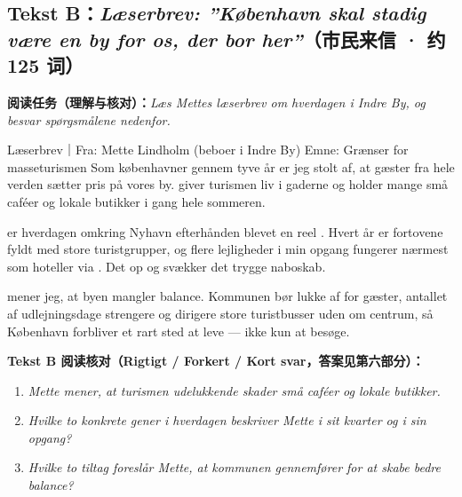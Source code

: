 \subsection*{Tekst B：\textit{Læserbrev: ”København skal stadig være en by for os, der bor her”}（市民来信 · 约 125 词）}

\textbf{阅读任务（理解与核对）：}\textit{Læs Mettes læserbrev om hverdagen i Indre By, og besvar spørgsmålene nedenfor.}

\begin{emailbox}{Læserbrev｜Fra: Mette Lindholm (beboer i Indre By) \quad Emne: Grænser for masseturismen}
Som københavner gennem tyve år er jeg stolt af, at gæster fra hele verden sætter pris på vores by.  giver turismen liv i gaderne og holder mange små caféer og lokale butikker i gang hele sommeren.

 er hverdagen omkring Nyhavn efterhånden blevet en reel . Hvert år er fortovene fyldt med store turistgrupper, og flere lejligheder i min opgang fungerer nærmest som hoteller via . Det  op og svækker det trygge naboskab.

 mener jeg, at byen mangler balance. Kommunen bør  lukke af for gæster,   antallet af udlejningsdage strengere og dirigere store turistbusser uden om centrum, så København forbliver et rart sted at leve --- ikke kun at besøge.
\end{emailbox}

\textbf{Tekst B 阅读核对（Rigtigt / Forkert / Kort svar，答案见第六部分）：}
\begin{enumerate}
  \item \textit{Mette mener, at turismen udelukkende skader små caféer og lokale butikker.} \underline{\hspace{2.2cm}}
  \item \textit{Hvilke to konkrete gener i hverdagen beskriver Mette i sit kvarter og i sin opgang?} \underline{\hspace{2.2cm}}
  \item \textit{Hvilke to tiltag foreslår Mette, at kommunen gennemfører for at skabe bedre balance?} \underline{\hspace{2.2cm}}
\end{enumerate}

